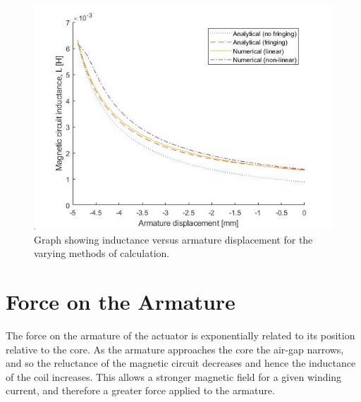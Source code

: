 \documentclass[a4paper]{IEEEtran}
\begin{document}
    \begin{figure}[ht]
        \includegraphics[width = \linewidth]{Inductances.jpg}
        \caption{Graph showing inductance versus armature displacement for the varying methods of calculation.}
        \label{inductanceGraph} 
    \end{figure}


\section{Force on the Armature}

    The force on the armature of the actuator is exponentially related to its position relative to the core. As the armature approaches the core the air-gap narrows, and so the reluctance of the magnetic circuit decreases and hence the inductance of the coil increases. This allows a stronger magnetic field for a given winding current, and therefore a greater force applied to the armature.
\end{document}
